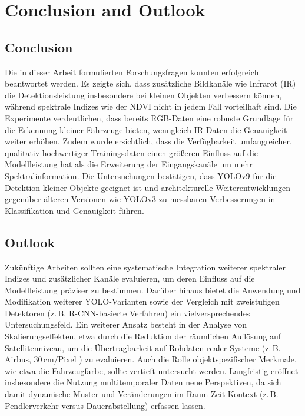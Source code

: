 \chapter{Conclusion and Outlook}
\label{ch:conclusion}

\section{Conclusion}
Die in dieser Arbeit formulierten Forschungsfragen konnten erfolgreich beantwortet werden. 
Es zeigte sich, dass zusätzliche Bildkanäle wie Infrarot (IR) die Detektionsleistung insbesondere bei kleinen Objekten verbessern können, während spektrale Indizes wie der NDVI nicht in jedem Fall vorteilhaft sind. 
Die Experimente verdeutlichen, dass bereits RGB-Daten eine robuste Grundlage für die Erkennung kleiner Fahrzeuge bieten, wenngleich IR-Daten die Genauigkeit weiter erhöhen. 
Zudem wurde ersichtlich, dass die Verfügbarkeit umfangreicher, qualitativ hochwertiger Trainingsdaten einen größeren Einfluss auf die Modellleistung hat als die Erweiterung der Eingangskanäle um mehr Spektralinformation. 
Die Untersuchungen bestätigen, dass \acrshort{YOLO}v9 für die Detektion kleiner Objekte geeignet ist und architekturelle Weiterentwicklungen gegenüber älteren Versionen wie \acrshort{YOLO}v3 zu messbaren Verbesserungen in Klassifikation und Genauigkeit führen.

\section{Outlook}
Zukünftige Arbeiten sollten eine systematische Integration weiterer spektraler Indizes und zusätzlicher Kanäle evaluieren, um deren Einfluss auf die Modellleistung präziser zu bestimmen. 
Darüber hinaus bietet die Anwendung und Modifikation weiterer \acrshort{YOLO}-Varianten sowie der Vergleich mit zweistufigen Detektoren (z.\,B. \acrshort{R-CNN}-basierte Verfahren) ein vielversprechendes Untersuchungsfeld. 
Ein weiterer Ansatz besteht in der Analyse von Skalierungseffekten, etwa durch die Reduktion der räumlichen Auflösung auf Satellitenniveau, um die Übertragbarkeit auf Rohdaten realer Systeme (z.\,B. Airbus, 30\,cm/Pixel \cite{airbus_neo}) zu evaluieren. 
Auch die Rolle objektspezifischer Merkmale, wie etwa die Fahrzeugfarbe, sollte vertieft untersucht werden. 
Langfristig eröffnet insbesondere die Nutzung multitemporaler Daten neue Perspektiven, da sich damit dynamische Muster und Veränderungen im Raum-Zeit-Kontext (z.\,B. Pendlerverkehr versus Dauerabstellung) erfassen lassen.

